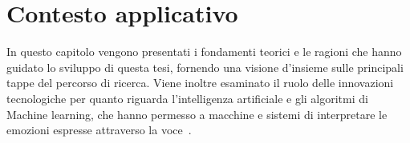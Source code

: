 \clearpage{\pagestyle{empty}\cleardoublepage}
\chapter{Contesto applicativo}                %
\lhead[\fancyplain{}{\bfseries\thepage}]{\fancyplain{}{\bfseries\rightmark}}

In questo capitolo vengono presentati i fondamenti teorici e le ragioni che hanno guidato lo sviluppo di questa tesi, fornendo una visione d'insieme sulle principali tappe del percorso di ricerca. Viene inoltre esaminato il ruolo delle innovazioni tecnologiche per quanto riguarda l'intelligenza artificiale e gli algoritmi di Machine learning, che hanno permesso a macchine e sistemi di interpretare le emozioni espresse attraverso la voce~\cite{9383000}.



%

